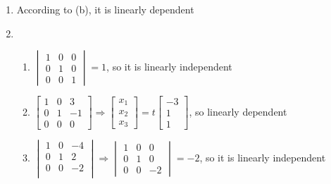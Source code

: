 \documentclass[12pt]{article}
\begin{document}
\begin{enumerate}
\begin{enumerate}
      \item According to (b), it is linearly dependent

      \item

        \begin{enumerate}

          \item $\begin{vmatrix}1&0&0\\0&1&0\\0&0&1\end{vmatrix}=1$, so it is linearly independent

          \item $\begin{bmatrix} 1&0&3\\0&1&-1\\0&0&0\end{bmatrix}\Rightarrow\begin{bmatrix}x_1\\x_2\\x_3\end{bmatrix}=t\begin{bmatrix}-3\\1\\1\end{bmatrix}$, so linearly dependent

        \item $\begin{vmatrix}1&0&-4\\0&1&2\\0 & 0 & -2\\\end{vmatrix}\Rightarrow\begin{vmatrix}1 & 0 & 0\\ 0 & 1 & 0\\0 & 0 & -2\end{vmatrix}=-2$, so it is linearly independent

        \end{enumerate}

    \end{enumerate}

    \setcounter{enumi}{46}


\end{enumerate}
\end{document}
